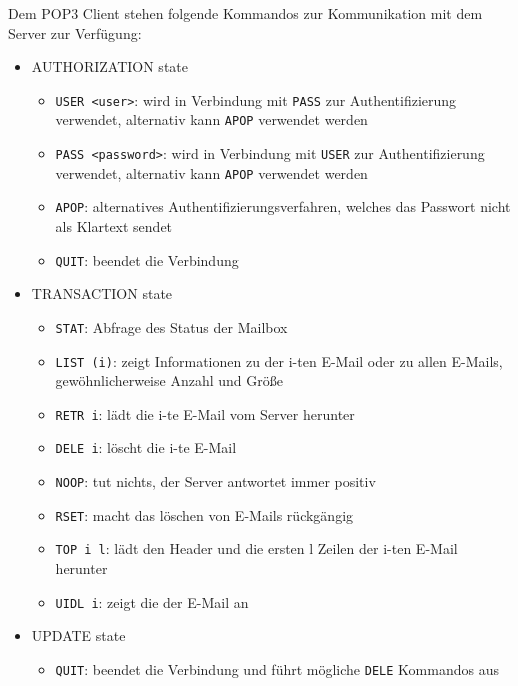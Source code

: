 Dem POP3 Client stehen folgende Kommandos zur Kommunikation mit dem Server zur Verfügung:
\begin{itemize}

\item AUTHORIZATION state
\begin{itemize}
	\item \verb#USER <user>#: wird in Verbindung mit \verb#PASS# zur Authentifizierung verwendet, alternativ kann \verb#APOP# verwendet werden
	\item \verb#PASS <password>#: wird in Verbindung mit \verb#USER# zur Authentifizierung verwendet, alternativ kann \verb#APOP# verwendet werden
	\item \verb#APOP#: alternatives Authentifizierungsverfahren, welches das Passwort nicht als Klartext sendet
	\item \verb#QUIT#: beendet die Verbindung
\end{itemize}

\item TRANSACTION state
\begin{itemize}
	\item \verb#STAT#: Abfrage des Status der Mailbox
	\item \verb#LIST (i)#: zeigt Informationen zu der i-ten E-Mail oder zu allen E-Mails, gewöhnlicherweise Anzahl und Größe
	\item \verb#RETR i#: lädt die i-te E-Mail vom Server herunter
	\item \verb#DELE i#: löscht die i-te E-Mail
	\item \verb#NOOP#: tut nichts, der Server antwortet immer positiv
	\item \verb#RSET#: macht das löschen von E-Mails rückgängig
	\item \verb#TOP i l#: lädt den Header und die ersten l Zeilen der i-ten E-Mail herunter
	\item \verb#UIDL i#: zeigt die  der E-Mail an
\end{itemize}

\item UPDATE state
\begin{itemize}
	\item \verb#QUIT#: beendet die Verbindung und führt mögliche \verb#DELE# Kommandos aus
\end{itemize}

\end{itemize}

